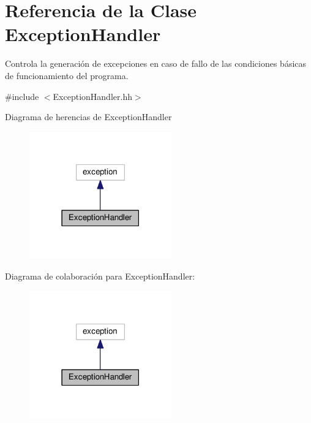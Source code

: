 \hypertarget{class_exception_handler}{}\section{Referencia de la Clase Exception\+Handler}
\label{class_exception_handler}


Controla la generación de excepciones en caso de fallo de las condiciones básicas de funcionamiento del programa.  




{\ttfamily \#include $<$Exception\+Handler.\+hh$>$}



Diagrama de herencias de Exception\+Handler
\nopagebreak
\begin{figure}[H]
\begin{center}
\leavevmode
\includegraphics[width=174pt]{class_exception_handler__inherit__graph}
\end{center}
\end{figure}


Diagrama de colaboración para Exception\+Handler\+:
\nopagebreak
\begin{figure}[H]
\begin{center}
\leavevmode
\includegraphics[width=174pt]{class_exception_handler__coll__graph}
\end{center}
\end{figure}
